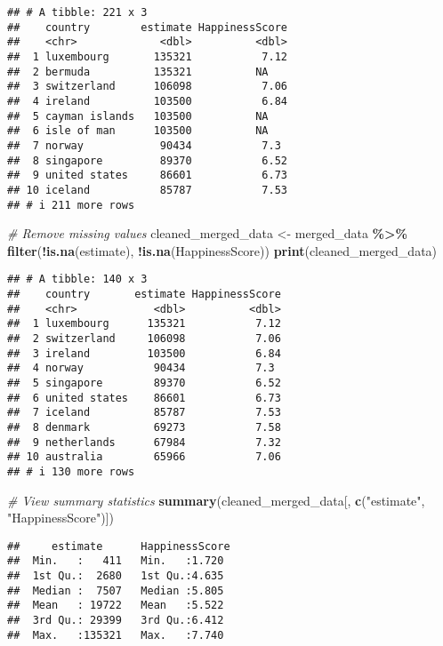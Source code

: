 \documentclass[
]{article}
\newenvironment{Shaded}{\begin{snugshade}}{\end{snugshade}}
\newcommand{\CommentTok}[1]{\textcolor[rgb]{0.56,0.35,0.01}{\textit{#1}}}
\newcommand{\FunctionTok}[1]{\textcolor[rgb]{0.13,0.29,0.53}{\textbf{#1}}}
\newcommand{\NormalTok}[1]{#1}
\newcommand{\OtherTok}[1]{\textcolor[rgb]{0.56,0.35,0.01}{#1}}
\newcommand{\SpecialCharTok}[1]{\textcolor[rgb]{0.81,0.36,0.00}{\textbf{#1}}}
\newcommand{\StringTok}[1]{\textcolor[rgb]{0.31,0.60,0.02}{#1}}
\begin{document}
\begin{verbatim}
## # A tibble: 221 x 3
##    country        estimate HappinessScore
##    <chr>             <dbl>          <dbl>
##  1 luxembourg       135321           7.12
##  2 bermuda          135321          NA   
##  3 switzerland      106098           7.06
##  4 ireland          103500           6.84
##  5 cayman islands   103500          NA   
##  6 isle of man      103500          NA   
##  7 norway            90434           7.3 
##  8 singapore         89370           6.52
##  9 united states     86601           6.73
## 10 iceland           85787           7.53
## # i 211 more rows
\end{verbatim}

\begin{Shaded}
\begin{Highlighting}[]
\CommentTok{\# Remove missing values}
\NormalTok{cleaned\_merged\_data }\OtherTok{\textless{}{-}}\NormalTok{ merged\_data }\SpecialCharTok{\%\textgreater{}\%}
  \FunctionTok{filter}\NormalTok{(}\SpecialCharTok{!}\FunctionTok{is.na}\NormalTok{(estimate), }\SpecialCharTok{!}\FunctionTok{is.na}\NormalTok{(HappinessScore))}
\FunctionTok{print}\NormalTok{(cleaned\_merged\_data)}
\end{Highlighting}
\end{Shaded}

\begin{verbatim}
## # A tibble: 140 x 3
##    country       estimate HappinessScore
##    <chr>            <dbl>          <dbl>
##  1 luxembourg      135321           7.12
##  2 switzerland     106098           7.06
##  3 ireland         103500           6.84
##  4 norway           90434           7.3 
##  5 singapore        89370           6.52
##  6 united states    86601           6.73
##  7 iceland          85787           7.53
##  8 denmark          69273           7.58
##  9 netherlands      67984           7.32
## 10 australia        65966           7.06
## # i 130 more rows
\end{verbatim}

\begin{Shaded}
\begin{Highlighting}[]
\CommentTok{\# View summary statistics }
\FunctionTok{summary}\NormalTok{(cleaned\_merged\_data[, }\FunctionTok{c}\NormalTok{(}\StringTok{"estimate"}\NormalTok{, }\StringTok{"HappinessScore"}\NormalTok{)])}
\end{Highlighting}
\end{Shaded}

\begin{verbatim}
##     estimate      HappinessScore 
##  Min.   :   411   Min.   :1.720  
##  1st Qu.:  2680   1st Qu.:4.635  
##  Median :  7507   Median :5.805  
##  Mean   : 19722   Mean   :5.522  
##  3rd Qu.: 29399   3rd Qu.:6.412  
##  Max.   :135321   Max.   :7.740
\end{verbatim}
\end{document}
